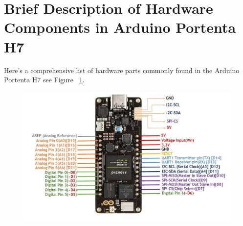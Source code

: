 \section{Brief Description of Hardware Components in Arduino Portenta H7}

Here's a comprehensive list of hardware parts commonly found in the Arduino Portenta H7 see Figure ~\ref{PortentaH7Hardware}.

\begin{figure}
		\begin{center}
		\includegraphics[width=0.7\linewidth]{images/ArduinoIDE/ArduinoHardware.jpg}
		\label{PortentaH7Hardware}
		\cite{portentaH7doc:2024}
	\end{center}
\end{figure}

